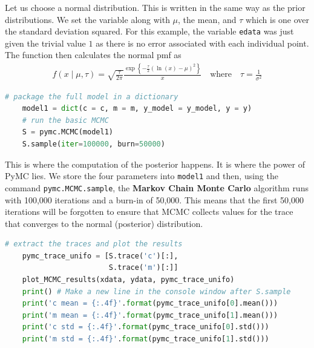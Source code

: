 \documentclass[12pt,twoside]{report}   %
\begin{document}
Let us choose a normal distribution. This is written in the same way as the prior distributions. We set the variable along with $\mu$, the mean, and $\tau$ which is one over the standard deviation squared. For this example, the variable \texttt{edata} was just given the trivial value $1$ as there is no error associated with each individual point. The function then calculates the normal pmf as
\begin{align*}
f(x\mid\mu,\tau) = \sqrt{\frac{\tau}{2\pi}}\frac{\exp\left\{-\frac{\tau}{2}\left(\ln(x) - \mu\right)^2\right\}}{x}\quad\text{where}\quad\tau = \frac{1}{\sigma^2}
\end{align*}

\begin{lstlisting}[label={python code 4}, caption={PyMC MCMC implementation},language=Python]
	# package the full model in a dictionary
	model1 = dict(c = c, m = m, y_model = y_model, y = y)
	# run the basic MCMC
	S = pymc.MCMC(model1)
	S.sample(iter=100000, burn=50000)
\end{lstlisting}

This is where the computation of the posterior happens. It is where the power of PyMC lies. We store the four parameters into \texttt{model1} and then, using the command \texttt{pymc.MCMC.sample}, the \textbf{Markov Chain Monte Carlo} algorithm runs with 100,000 iterations and a burn-in of 50,000. This means that the first 50,000 iterations will be forgotten to ensure that MCMC collects values for the trace that converges to the normal (posterior) distribution.
\begin{lstlisting}[label={python code 5},caption={PyMC trace extraction},language=Python]
	# extract the traces and plot the results
	pymc_trace_unifo = [S.trace('c')[:],
    	                S.trace('m')[:]]
	plot_MCMC_results(xdata, ydata, pymc_trace_unifo)
	print() # Make a new line in the console window after S.sample
	print('c mean = {:.4f}'.format(pymc_trace_unifo[0].mean()))
	print('m mean = {:.4f}'.format(pymc_trace_unifo[1].mean()))
	print('c std = {:.4f}'.format(pymc_trace_unifo[0].std()))
	print('m std = {:.4f}'.format(pymc_trace_unifo[1].std()))
\end{lstlisting}
\end{document}
